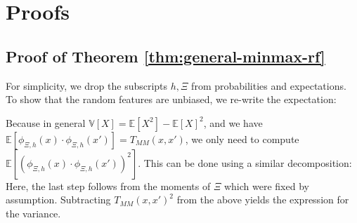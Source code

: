 \section{Proofs}\label{proofs in appendix}

\subsection{Proof of Theorem \ref{thm:general-minmax-rf}}\label{apdx:minmax-rf-proof}

    For simplicity, we drop the subscripts $h,\Xi$ from probabilities and expectations. To show that the random features are unbiased, we re-write the expectation:

    Because in general $\mathbb{V}[X]=\mathbb{E}[X^2]-\mathbb{E}[X]^2$,
    and we have $\mathbb{E}\left[ \phi_{\Xi,h}(x)\cdot \phi_{\Xi,h}(x')\right]=T_{MM}(x,x')$,
    we only need to compute
    $\mathbb{E}\left[ \left(\phi_{\Xi,h}(x)\cdot \phi_{\Xi,h}(x')\right)^2\right]$.
    This can be done using a similar decomposition:
    Here, the last step follows from the moments of $\Xi$ which were fixed by assumption.
    Subtracting $T_{MM}(x,x')^2$ from the above yields the expression for the variance.

